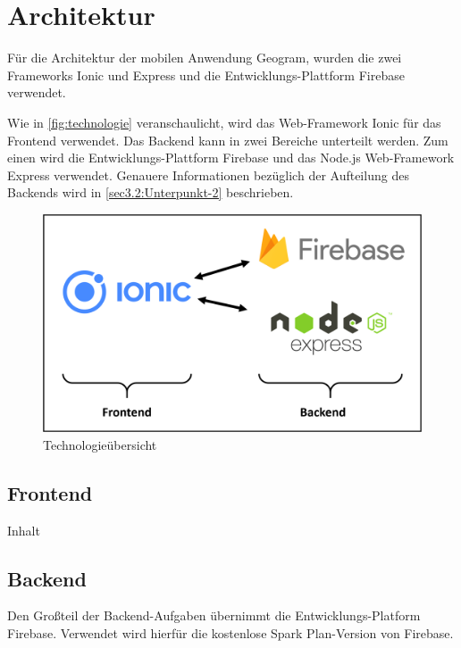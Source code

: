 \chapter{Architektur\label{chap3:Drittes-Kapitel}}

Für die Architektur der mobilen Anwendung \glqq Geogram\grqq{}, wurden die zwei Frameworks \glqq Ionic\grqq{} und \glqq Express\grqq{} und die Entwicklungs-Plattform \glqq Firebase\grqq{} verwendet.

Wie in \autoref{fig:technologie} veranschaulicht, wird das Web-Framework \glqq Ionic\grqq{} für das Frontend verwendet. Das Backend kann in zwei Bereiche unterteilt werden. Zum einen wird die Entwicklungs-Plattform \glqq Firebase\grqq{} und das Node.js Web-Framework \glqq Express\grqq{} verwendet. Genauere Informationen bezüglich der Aufteilung des Backends wird in \autoref{sec3.2:Unterpunkt-2} beschrieben.

\begin{figure}[H]
    \centering
    \includegraphics[width=.8\linewidth]{images/Architektur.png}
    \caption{Technologieübersicht}
    \label{fig:technologie}
\end{figure}

\section{Frontend\label{sec3.1:Unterpunkt-1}}

Inhalt

\section{Backend\label{sec3.2:Unterpunkt-2}}

Den Großteil der Backend-Aufgaben übernimmt die Entwicklungs-Platform Firebase. Verwendet wird hierfür die kostenlose \glqq Spark Plan\grqq{}-Version von Firebase. 


